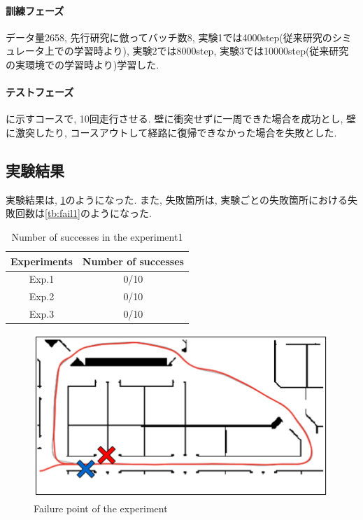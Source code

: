 \newpage
\paragraph{訓練フェーズ}
データ量2658, 先行研究に倣ってバッチ数8, 実験1では4000step(従来研究のシミュレータ上での学習時より), 実験2では8000step, 実験3では10000step(従来研究の実環境での学習時より)学習した.

\paragraph{テストフェーズ}
に示すコースで, 10回走行させる. 壁に衝突せずに一周できた場合を成功とし, 壁に激突したり, コースアウトして経路に復帰できなかった場合を失敗とした.

\subsection{実験結果}
実験結果は, \ref{tb:exp1}のようになった. また, 失敗箇所は, 実験ごとの失敗箇所における失敗回数は\ref{tb:fail1}のようになった. 

\begin{table}[h]
  \centering
  \begin{tabular}{|c|c|} \hline
    Experiments & Number of successes \\ \hline
    Exp.1 & 0/10 \\ \hline
    Exp.2 & 0/10 \\ \hline
    Exp.3 & 0/10 \\ \hline
  \end{tabular}
  \caption{Number of successes in the experiment1}
  \label{tb:exp1}
\end{table}

\begin{figure}[h]
  \centering
  \includegraphics[keepaspectratio, scale=0.5]{images/result1.png}
  \caption{Failure point of the experiment}
  \label{Fig:result1}
  \end{figure}

